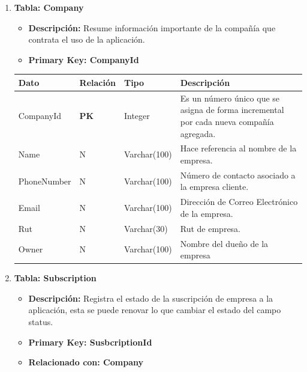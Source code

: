 \documentclass[12pt]{article}
\begin{document}
\begin{enumerate}
    \item \textbf{Tabla: Company}
    \begin{itemize}
        \item \textbf{Descripción:} Resume información importante de la compañía que contrata el uso de la aplicación.
        \item \textbf{Primary Key: CompanyId}
    \end{itemize}
    \begin{table}[!h]
        \centering
        \begin{tabular}{|p{3cm}|p{2cm}|p{2.5cm}|p{8cm}|}
            \hline
             \textbf{Dato} & \textbf{Relación} & \textbf{Tipo} & \textbf{Descripción} \\
             \hline
             CompanyId & \textbf{PK} & Integer & Es un número único que se asigna de forma incremental por cada nueva compañía agregada. \\
             \hline
             Name & N & Varchar(100) & Hace referencia al nombre de la empresa. \\
             \hline
             PhoneNumber & N & Varchar(100) & Número de contacto asociado a la empresa cliente. \\
             \hline
             Email & N & Varchar(100) & Dirección de Correo Electrónico de la empresa. \\
             \hline
             Rut & N & Varchar(30) & Rut de empresa. \\
             \hline
             Owner & N & Varchar(100) & Nombre del dueño de la empresa \\
             \hline
        \end{tabular}
    \end{table}
    \item \textbf{Tabla: Subscription}
    \begin{itemize}
        \item \textbf{Descripción:} Registra el estado de la suscripción de empresa a la aplicación, esta se puede renovar lo que cambiar el estado del campo status.
        \item \textbf{Primary Key: SusbcriptionId}
        \item \textbf{Relacionado con: Company}
    \end{itemize}
    \begin{table}[!h]
        \centering
        \begin{tabular}{|p{3cm}|p{2cm}|p{2.5cm}|p{8cm}|}

\end{tabular}
\end{table}
\end{enumerate}
\end{document}

